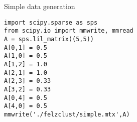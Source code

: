 Simple data generation

\begin{verbatim}
import scipy.sparse as sps
from scipy.io import mmwrite, mmread
A = sps.lil_matrix((5,5))
A[0,1] = 0.5
A[1,0] = 0.5
A[1,2] = 1.0
A[2,1] = 1.0
A[2,3] = 0.33
A[3,2] = 0.33
A[0,4] = 0.5
A[4,0] = 0.5
mmwrite('./felzclust/simple.mtx',A)
\end{verbatim}


